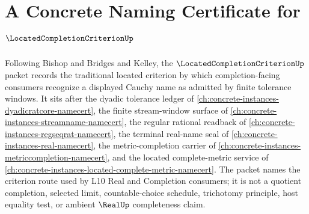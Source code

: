 \chapter{A Concrete Naming Certificate for $\LocatedCompletionCriterionUp$}
\label{ch:concrete-instances-located-completion-criterion-namecert}

Following Bishop and Bridges and Kelley, the $\LocatedCompletionCriterionUp$ packet records the traditional located criterion by which completion-facing consumers recognize a displayed Cauchy name as admitted by finite tolerance windows. It sits after the dyadic tolerance ledger of \autoref{ch:concrete-instances-dyadicratcore-namecert}, the finite stream-window surface of \autoref{ch:concrete-instances-streamname-namecert}, the regular rational readback of \autoref{ch:concrete-instances-regseqrat-namecert}, the terminal real-name seal of \autoref{ch:concrete-instances-real-namecert}, the metric-completion carrier of \autoref{ch:concrete-instances-metriccompletion-namecert}, and the located complete-metric service of \autoref{ch:concrete-instances-located-complete-metric-namecert}. The packet names the criterion route used by L10 Real and Completion consumers; it is not a quotient completion, selected limit, countable-choice schedule, trichotomy principle, host equality test, or ambient $\RealUp$ completeness claim.

